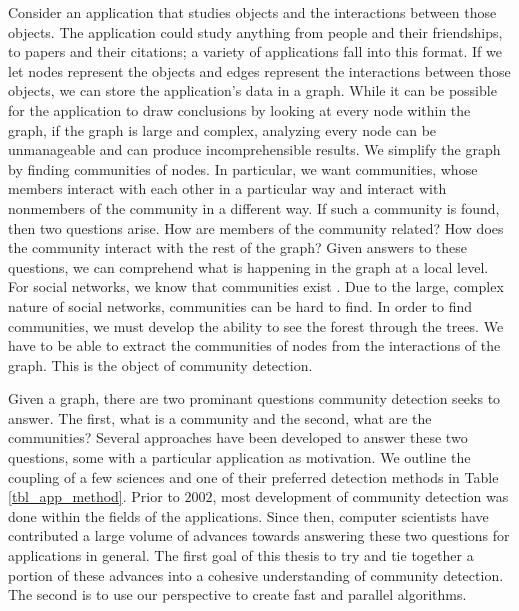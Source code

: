\documentclass[phd,tocprelim]{cornell}
\begin{document}
Consider an application that studies objects and the interactions between those objects.  The application could study anything from people and their friendships, to papers and their citations; a variety of applications fall into this format.  If we let nodes represent the objects and edges represent the interactions between those objects, we can store the application's data in a graph.  While it can be possible for the application to draw conclusions by looking at every node within the graph, if the graph is large and complex, analyzing every node can be unmanageable and can produce incomprehensible results.   We simplify the graph by finding communities of nodes.  In particular, we want communities, whose members interact with each other in a particular way and interact with nonmembers of the community in a different way. If such a community is found, then two questions arise.  How are members of the community related?  How does the community interact with the rest of the graph?  Given answers to these questions, we can comprehend what is happening in the graph at a local level.  For social networks, we know that communities exist \cite{JTODO}.  Due to the large, complex nature of social networks, communities can be hard to find.  In order to find communities, we must develop the ability to see the forest through the trees.  We have to be able to extract the communities of nodes from the interactions of the graph.  This is the object of community detection.


Given a graph, there are two prominant questions community detection seeks to answer.  The first, what is a community and the second, what are the communities?  Several approaches have been developed to answer these two questions, some with a particular application as motivation.  We outline the coupling of a few sciences and one of their preferred detection methods in Table \ref{tbl_app_method}. Prior to $2002$, most development of community detection was done within the fields of the applications.  Since then, computer scientists have contributed a large volume of advances towards answering these two questions for applications in general.  The first goal of this thesis to try and tie together a portion of these advances into a cohesive understanding of community detection.  The second is to use our perspective to create fast and parallel algorithms.
\end{document}
